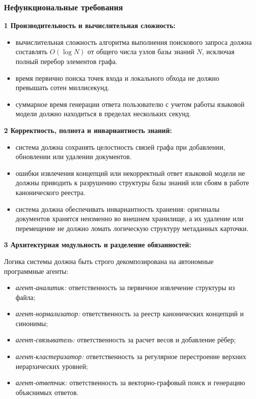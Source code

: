 \subsubsection{Нефункциональные требования}

    \textbf{1 Производительность и вычислительная сложность:}
    \begin{itemize}
        \item вычислительная сложность алгоритма выполнения поискового запроса должна составлять $O(\log N)$ от общего числа узлов базы знаний $N$, исключая полный перебор элементов графа.
        \item время первично поиска точек входа и локального обхода не должно превышать сотен миллисекунд.
        \item суммарное время генерации ответа пользователю с учетом работы языковой модели должно находиться в пределах нескольких секунд.
    \end{itemize}

    \textbf{2 Корректность, полнота и инвариантность знаний:}
    \begin{itemize}
        \item система должна сохранять целостность связей графа при добавлении, обновлении или удалении документов.
        \item ошибки извлечения концепций или некорректный ответ языковой модели не должны приводить к разрушению структуры базы знаний или сбоям в работе канонического реестра.
        \item система должна обеспечивать инвариантность хранения: оригиналы документов хранятся неизменно во внешнем хранилище, а их удаление или перемещение не должно ломать логическую структуру метаданных карточки.
    \end{itemize}

    \textbf{3 Архитектурная модульность и разделение обязанностей:}
    
        Логика системы должна быть строго декомпозирована на автономные программные агенты:
        \begin{itemize}
            \item \textit{агент-аналитик:} ответственность за первичное извлечение структуры из файла;
            \item \textit{агент-нормализатор:} ответственность за реестр канонических концепций и синонимы;
            \item \textit{агент-связыватель:} ответственность за расчет весов и добавление рёбер;
            \item \textit{агент-кластеризатор:} ответственность за регулярное перестроение верхних иерархических уровней;
            \item \textit{агент-ответчик:} ответственность за векторно-графовый поиск и генерацию объяснимых ответов.
        \end{itemize}
        
